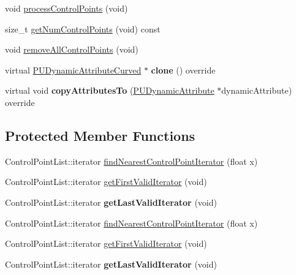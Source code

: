 \begin{DoxyCompactItemize}
void \hyperlink{classPUDynamicAttributeCurved_a42e53d97ce7140afa04da3e09801d719}{process\+Control\+Points} (void)
\item 
size\+\_\+t \hyperlink{classPUDynamicAttributeCurved_a12faf3ab6827362c7efffe32346f7388}{get\+Num\+Control\+Points} (void) const
\item 
void \hyperlink{classPUDynamicAttributeCurved_aafd05dd4bb62d9a495f48d18cb646c1b}{remove\+All\+Control\+Points} (void)
\item 
\mbox{\label{classPUDynamicAttributeCurved_a46c07a162e3056c514dba860fb094b0d}} 
virtual \hyperlink{classPUDynamicAttributeCurved}{P\+U\+Dynamic\+Attribute\+Curved} $\ast$ {\bfseries clone} () override
\item 
\mbox{\label{classPUDynamicAttributeCurved_a8c6a34977456ac654ad93e53881abab0}} 
virtual void {\bfseries copy\+Attributes\+To} (\hyperlink{classPUDynamicAttribute}{P\+U\+Dynamic\+Attribute} $\ast$dynamic\+Attribute) override
\end{DoxyCompactItemize}
\subsection*{Protected Member Functions}
\begin{DoxyCompactItemize}
\item 
Control\+Point\+List\+::iterator \hyperlink{classPUDynamicAttributeCurved_ae1b170a6b0bc20d57c91a9186fbb1d0e}{find\+Nearest\+Control\+Point\+Iterator} (float x)
\item 
Control\+Point\+List\+::iterator \hyperlink{classPUDynamicAttributeCurved_aa068c48bd9d0cb3c6154d1382d5ed8c3}{get\+First\+Valid\+Iterator} (void)
\item 
\mbox{\label{classPUDynamicAttributeCurved_a358847ee903389a23e1b8199e537b911}} 
Control\+Point\+List\+::iterator {\bfseries get\+Last\+Valid\+Iterator} (void)
\item 
Control\+Point\+List\+::iterator \hyperlink{classPUDynamicAttributeCurved_adb9b769e22c71411cc6ddb909bab3621}{find\+Nearest\+Control\+Point\+Iterator} (float x)
\item 
Control\+Point\+List\+::iterator \hyperlink{classPUDynamicAttributeCurved_a9c93266e42134d30e5b3bb20533f42ef}{get\+First\+Valid\+Iterator} (void)
\item 
\mbox{\label{classPUDynamicAttributeCurved_aa3cf4e4c864812f639e17a3f86cbd7ae}} 
Control\+Point\+List\+::iterator {\bfseries get\+Last\+Valid\+Iterator} (void)
\end{DoxyCompactItemize}
